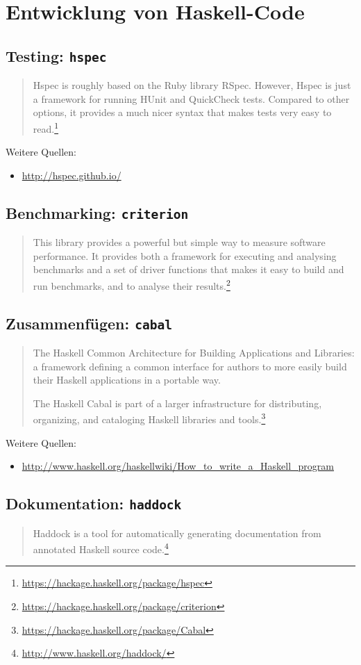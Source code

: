 \section{Entwicklung von Haskell-Code}

\subsection{Testing: \texttt{hspec}}
\begin{quote}
  Hspec is roughly based on the Ruby library RSpec. However, Hspec is just a
  framework for running HUnit and QuickCheck tests. Compared to other options,
  it provides a much nicer syntax that makes tests very easy to
  read.\footnote{\url{https://hackage.haskell.org/package/hspec}}
\end{quote}
Weitere Quellen:
\begin{itemize}
  \item \url{http://hspec.github.io/}
\end{itemize}

\subsection{Benchmarking: \texttt{criterion}}
\begin{quote}
  This library provides a powerful but simple way to measure software
  performance. It provides both a framework for executing and analysing
  benchmarks and a set of driver functions that makes it easy to build and run
  benchmarks, and to analyse their
  results.\footnote{\url{https://hackage.haskell.org/package/criterion}}
\end{quote}

\subsection{Zusammenfügen: \texttt{cabal}}
\begin{quote}
  The Haskell Common Architecture for Building Applications and Libraries: a
  framework defining a common interface for authors to more easily build their
  Haskell applications in a portable way.

  The Haskell Cabal is part of a larger infrastructure for distributing,
  organizing, and cataloging Haskell libraries and
  tools.\footnote{\url{https://hackage.haskell.org/package/Cabal}}
\end{quote}
Weitere Quellen:
\begin{itemize}
  \item \url{http://www.haskell.org/haskellwiki/How_to_write_a_Haskell_program}
\end{itemize}

\subsection{Dokumentation: \texttt{haddock}}
\begin{quote}
  Haddock is a tool for automatically generating documentation from annotated
  Haskell source code.\footnote{\url{http://www.haskell.org/haddock/}}
\end{quote}
